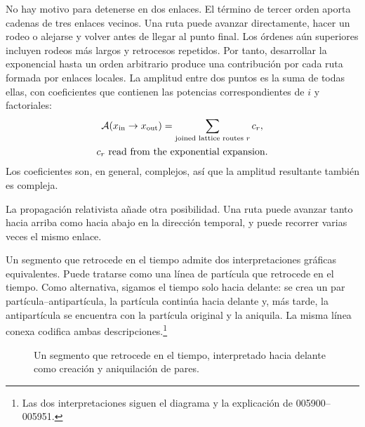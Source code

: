No hay motivo para detenerse en dos enlaces. El término de tercer orden aporta cadenas de tres enlaces vecinos. Una ruta puede avanzar directamente, hacer un rodeo o alejarse y volver antes de llegar al punto final. Los órdenes aún superiores incluyen rodeos más largos y retrocesos repetidos. Por tanto, desarrollar la exponencial hasta un orden arbitrario produce una contribución por cada ruta formada por enlaces locales. La amplitud entre dos puntos es la suma de todas ellas, con coeficientes que contienen las potencias correspondientes de \(i\) y factoriales:
\begin{equation}
\begin{gathered}
\mathcal{A}(x_{\mathrm{in}}\to x_{\mathrm{out}})
=
\sum_{\text{joined lattice routes }r}c_r,
\\
c_r\ \hbox{read from the exponential expansion}.
\end{gathered}
\end{equation}
Los coeficientes son, en general, complejos, así que la amplitud resultante también es compleja.

La propagación relativista añade otra posibilidad. Una ruta puede avanzar tanto hacia arriba como hacia abajo en la dirección temporal, y puede recorrer varias veces el mismo enlace.

\begin{classroomqa}
\end{classroomqa}

Un segmento que retrocede en el tiempo admite dos interpretaciones gráficas equivalentes. Puede tratarse como una línea de partícula que retrocede en el tiempo. Como alternativa, sigamos el tiempo solo hacia delante: se crea un par partícula--antipartícula, la partícula continúa hacia delante y, más tarde, la antipartícula se encuentra con la partícula original y la aniquila. La misma línea conexa codifica ambas descripciones.\footnote{Las dos interpretaciones siguen el diagrama y la explicación de 005900--005951.}

\begin{figure}[htbp]\centering
{}\caption{Un segmento que retrocede en el tiempo, interpretado hacia delante como creación y aniquilación de pares.}\end{figure}

